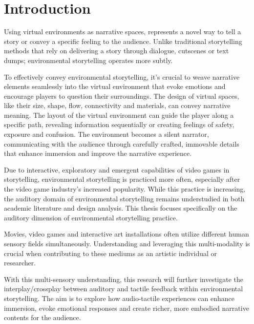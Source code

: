 \chapter{Introduction}
    Using virtual environments as narrative spaces, represents a novel way to tell a story or convey a specific feeling to the audience. Unlike traditional storytelling methods that rely on delivering a story through dialogue, cutscenes or text dumps; environmental storytelling operates more subtly.\par

    To effectively convey environmental storytelling, it’s crucial to weave narrative elements seamlessly into the virtual environment that evoke emotions and encourage players to question their surroundings. The design of virtual spaces, like their size, shape, flow, connectivity and materials, can convey narrative meaning. The layout of the virtual environment can guide the player along a specific path, revealing information sequentially or creating feelings of safety, exposure and confusion. The environment becomes a silent narrator, communicating with the audience through carefully crafted, immovable details that enhance immersion and improve the narrative experience\cite{Environmental_Storytelling_Blogpost}.\par

    Due to interactive, exploratory and emergent capabilities of video games in storytelling, environmental storytelling is practiced more often, especially after the video game industry's increased popularity\cite{Video_Game_Industry_Stat}. While this practice is increasing, the auditory domain of environmental storytelling remains understudied in both academic literature and design analysis\cite{Archaeological_Gameworld}. This thesis focuses specifically on the auditory dimension of environmental storytelling practice.\par

    Movies, video games and interactive art installations often utilize different human sensory fields simultaneously. Understanding and leveraging this multi-modality is crucial when contributing to these mediums as an artistic individual or researcher.\par

    With this multi-sensory understanding, this research will further investigate the interplay/crossplay between auditory and tactile feedback within environmental storytelling. The aim is to explore how audio-tactile experiences can enhance immersion, evoke emotional responses and create richer, more embodied narrative contents for the audience.\par
